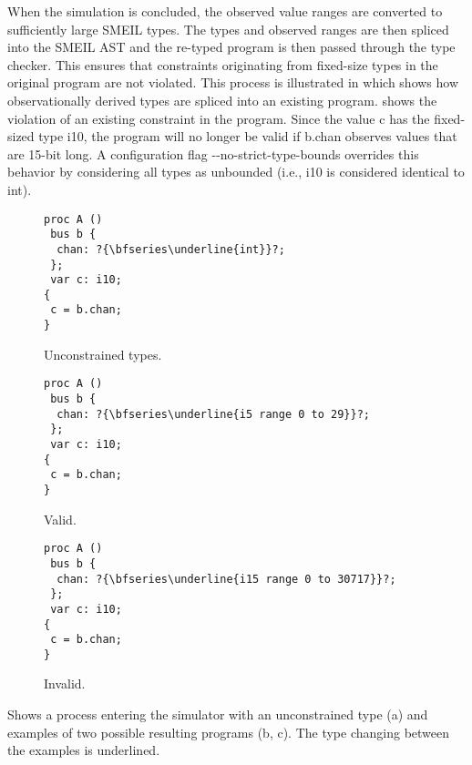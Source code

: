 When the simulation is concluded, the observed value ranges are converted to
sufficiently large SMEIL types. The types and observed ranges are then spliced
into the SMEIL AST and the re-typed program is then passed through the type
checker. This ensures that constraints originating from fixed-size types in the
original program are not violated. This process is illustrated in
 which shows how observationally derived types are spliced
into an existing program.  shows the violation of an existing
constraint in the program. Since the value {\ttfamily c} has the fixed-sized
type {\ttfamily i10}, the program will no longer be valid if {\ttfamily b.chan}
observes values that are 15-bit long. A configuration flag {\ttfamily
  -{}-no-strict-type-bounds} overrides this behavior by considering all types as
unbounded (i.e., {\ttfamily i10} is considered identical to {\ttfamily int}).


\begin{widefigure}
  \centering
  \begin{subfigure}[t]{0.30\linewidth}
\begin{lstlisting}[language=smeil]
proc A ()
 bus b {
  chan: ?{\bfseries\underline{int}}?;
 };
 var c: i10;
{
 c = b.chan;
}
\end{lstlisting}
    \caption{Unconstrained types.}
  \end{subfigure}
  \begin{subfigure}[t]{0.30\linewidth}
    \begin{lstlisting}[language=smeil]
proc A ()
 bus b {
  chan: ?{\bfseries\underline{i5 range 0 to 29}}?;
 };
 var c: i10;
{
 c = b.chan;
}
    \end{lstlisting}
    \caption{Valid.}
  \end{subfigure}
  \begin{subfigure}[t]{0.30\linewidth}
    \begin{lstlisting}[language=smeil]
proc A ()
 bus b {
  chan: ?{\bfseries\underline{i15 range 0 to 30717}}?;
 };
 var c: i10;
{
 c = b.chan;
}
\end{lstlisting}
    \caption{Invalid.}
    \label{fig:violated}
  \end{subfigure}
  \caption{Shows a process entering the simulator with an unconstrained type (a)
    and examples of two possible resulting programs (b, c). The type changing
    between the examples is underlined.}
  \label{fig:simtyping}
\end{widefigure}

